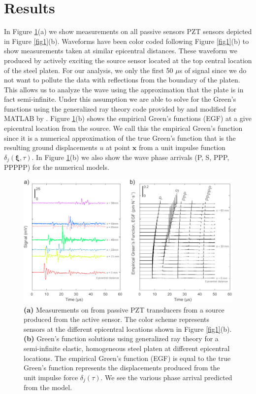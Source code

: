 \documentclass[preprint,3p, 11pt,authoryear]{elsarticle}
\begin{document}
\section{Results}
\label{results}

In Figure \ref{fig3}(a) we show measurements on all passive sensors PZT sensors depicted in Figure \ref{fig1}(b).  Waveforms have been color coded following Figure \ref{fig1}(b) to show measurements taken at similar epicentral distances. These waveform we produced by actively exciting the source sensor located at the top central location of the steel platen. For our analysis, we only the first 50 $\mu$s of signal since we do not want to pollute the data with reflections from the boundary of the platen.  This allows us to analyze the wave using the approximation that the plate is in fact semi-infinite. Under this assumption we are able to solve for the Green's functions using the generalized ray theory code provided by \citet{Hsu1985} and modified for MATLAB by \citet{McLaskey2012}.  Figure \ref{fig3}(b) shows the empirical Green's functions (EGF) at a give epicentral location from the source. We call this the empirical Green's function since it is a numerical approximation of the true Green's function that is the resulting ground displacements $u$ at point $\mathbf{x}$ from a unit impulse function $\delta_{j}(\mathbf{\xi}, \tau)$. In Figure \ref{fig3}(b) we also show the wave phase arrivals (P, S, PPP, PPPPP) for the numerical models.

\begin{figure}[ht]
     	\centering
\includegraphics[scale= 1.0]{FIG3.pdf} 
\caption{\textbf{(a)} Measurements on from passive PZT transducers from a source produced from the active sensor. The color scheme represents sensors at the different epicentral locations shown in Figure \ref{fig1}(b).  \textbf{(b)} Green's function solutions using generalized ray theory for a semi-infinite elastic, homogeneous steel platen at different epicentral locations.  The empirical Green's function (EGF) is equal to the true Green's function represents the displacements produced from the unit impulse force $\delta_{j}(\tau)$. We see the various phase arrival predicted from the model.}
	\label{fig3} 
\end{figure}
\end{document}
